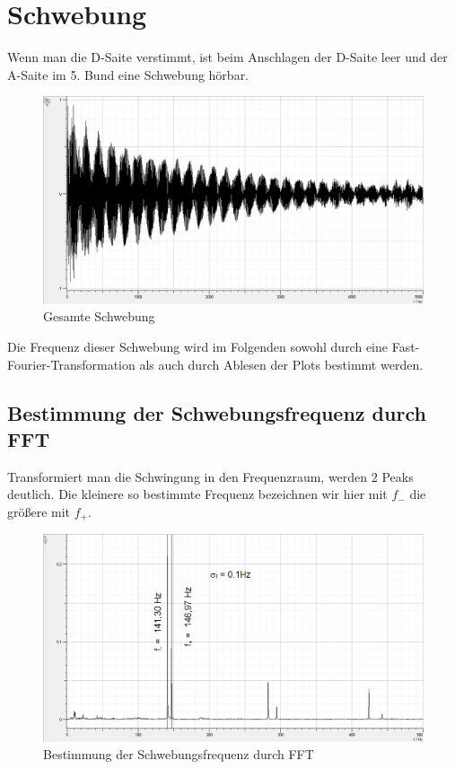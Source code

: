 \documentclass[12pt,a4paper]{article}
\begin{document}
\section{Schwebung}
Wenn man die D-Saite verstimmt, ist beim Anschlagen der D-Saite leer und der A-Saite im 5. Bund eine Schwebung hörbar.
\begin{figure}[H]
\centering
\includegraphics[scale=0.5]{schwebung/Schwebung_Roh.png}
\caption{Gesamte Schwebung}
\end{figure}

Die Frequenz dieser Schwebung wird im Folgenden sowohl durch eine Fast-Fourier-Transformation als auch durch Ablesen der Plots bestimmt werden.

\subsection{Bestimmung der Schwebungsfrequenz durch FFT}
Transformiert man die Schwingung in den Frequenzraum, werden 2 Peaks deutlich. Die kleinere so bestimmte Frequenz bezeichnen wir hier mit $f_-$ die größere mit $f_+$.
\begin{figure}[H]
\centering
\includegraphics[scale=0.5]{schwebung/Schwebung_FFT.png}
\caption{Bestimmung der Schwebungsfrequenz durch FFT}
\end{figure}
\end{document}
